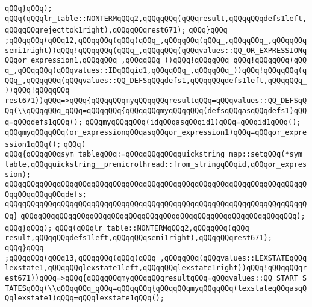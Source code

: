 \verb|qQQq}qQQq);|\newline
\verb|qQQq(qQQqlr_table::NONTERMqQQq2,qQQqqQQq(qQQqresult,qQQqqQQqdefs1left,qQQqqQQqrejecttok1right),qQQqqQQqrest671);|\newline
\verb|qQQq}qQQq|\newline
\verb|;qQQqqQQq(qQQq12,qQQqqQQq(qQQq(qQQq_,qQQqqQQq(qQQq_,qQQqqQQq_,qQQqqQQqsemi1right))qQQq!qQQqqQQq(qQQq_,qQQqqQQq(qQQqvalues::QQ_OR_EXPRESSIONqQQqor_expression1,qQQqqQQq_,qQQqqQQq_))qQQq!qQQqqQQq_qQQq!qQQqqQQq(qQQq_,qQQqqQQq(qQQqvalues::IDqQQqid1,qQQqqQQq_,qQQqqQQq_))qQQq!qQQqqQQq(qQQq_,qQQqqQQq(qQQqvalues::QQ_DEFSqQQqdefs1,qQQqqQQqdefs1left,qQQqqQQq_))qQQq!qQQqqQQq|\newline
\verb|rest671))qQQq=>qQQq{qQQqqQQqmyqQQqqQQqresultqQQq=qQQqvalues::QQ_DEFSqQQq(\\qQQqqQQq_qQQq=qQQqqQQq{qQQqqQQqmyqQQqqQQq(defsqQQqasqQQqdefs1)qQQq=qQQqdefs1qQQq();|\newline
\verb|qQQqmyqQQqqQQq(idqQQqasqQQqid1)qQQq=qQQqid1qQQq();|\newline
\verb|qQQqmyqQQqqQQq(or_expressionqQQqasqQQqor_expression1)qQQq=qQQqor_expression1qQQq();|\newline
\verb|qQQq(|\newline
\verb|qQQq{qQQqqQQqsym_tableqQQq:=qQQqqQQqqQQqquickstring_map::setqQQq(*sym_table,qQQqquickstring__premicrothread::from_stringqQQqid,qQQqor_expression);|\newline
\verb|qQQqqQQqqQQqqQQqqQQqqQQqqQQqqQQqqQQqqQQqqQQqqQQqqQQqqQQqqQQqqQQqqQQqqQQqqQQqqQQqqQQqdefs;|\newline
\verb|qQQqqQQqqQQqqQQqqQQqqQQqqQQqqQQqqQQqqQQqqQQqqQQqqQQqqQQqqQQqqQQqqQQqqQQq}|\newline
\verb|qQQqqQQqqQQqqQQqqQQqqQQqqQQqqQQqqQQqqQQqqQQqqQQqqQQqqQQqqQQqqQQq);|\newline
\verb|qQQq}qQQq);|\newline
\verb|qQQq(qQQqlr_table::NONTERMqQQq2,qQQqqQQq(qQQq|\newline
\verb|result,qQQqqQQqdefs1left,qQQqqQQqsemi1right),qQQqqQQqrest671);|\newline
\verb|qQQq}qQQq|\newline
\verb|;qQQqqQQq(qQQq13,qQQqqQQq(qQQq(qQQq_,qQQqqQQq(qQQqvalues::LEXSTATEqQQqlexstate1,qQQqqQQqlexstate1left,qQQqqQQqlexstate1right))qQQq!qQQqqQQqrest671))qQQq=>qQQq{qQQqqQQqmyqQQqqQQqresultqQQq=qQQqvalues::QQ_START_STATESqQQq(\\qQQqqQQq_qQQq=qQQqqQQq{qQQqqQQqmyqQQqqQQq(lexstateqQQqasqQQqlexstate1)qQQq=qQQqlexstate1qQQq();|\newline
